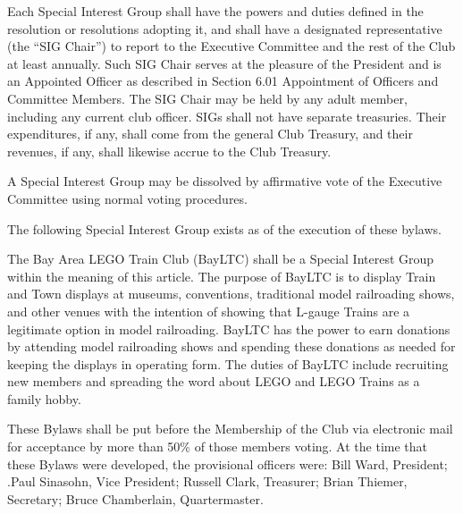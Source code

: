 \documentclass{bylaws}
\begin{document}
Each Special Interest Group shall have the powers and duties defined in the resolution or resolutions adopting it, and shall have a designated representative (the “SIG Chair”) to report to the Executive Committee and the rest of the Club at least annually. Such SIG Chair serves at the pleasure of the President and is an Appointed Officer as described in Section 6.01 Appointment of Officers and Committee Members. The SIG Chair may be held by any adult member, including any current club officer. 
SIGs shall not have separate treasuries. Their expenditures, if any, shall come from the general Club Treasury, and their revenues, if any, shall likewise accrue to the Club Treasury. 

A Special Interest Group may be dissolved by affirmative vote of the Executive Committee using normal voting procedures. 

The following Special Interest Group exists as of the execution of these bylaws. 

The Bay Area LEGO Train Club (BayLTC) shall be a Special Interest Group within the meaning of this article. The purpose of BayLTC is to display Train and Town displays at museums, conventions, traditional model railroading shows, and other venues with the intention of showing that L-gauge Trains are a legitimate option in model railroading. BayLTC has the power to earn donations by attending model railroading shows and spending these donations as needed for keeping the displays in operating form. The duties of BayLTC include recruiting new members and spreading the word about LEGO and LEGO Trains as a family hobby. 


These Bylaws shall be put before the Membership of the Club via electronic mail for acceptance by more than 50\% of those members voting.  At the time that these Bylaws were developed, the provisional officers were: Bill Ward, President; .Paul Sinasohn, Vice President; Russell Clark, Treasurer; Brian Thiemer, Secretary; Bruce Chamberlain, Quartermaster. 


\end{document}
